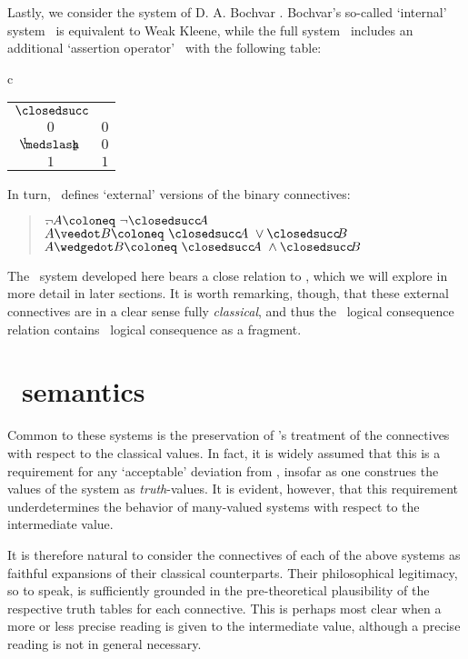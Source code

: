	Lastly, we consider the system of D. A. Bochvar \citeyear{Bochvar1937}. Bochvar's so-called `internal' system \Bthree\ is equivalent to Weak Kleene, while the full system \BthreeE\ includes an additional `assertion operator' \Assert\ with the following table:
\begin{singlespace}	
	\begin{longtable}{c}
		\begin{tabular}{c | c}
			$\Assert$ &  \\
			\cline{1-2} 
			$0$ 		& $0$ \\ 
			$\oneHalf$  & $0$ \\
			$1$ 		& $1$ \\
		\end{tabular} 
	\end{longtable}
\end{singlespace}
\noindent In turn, \BthreeE\ defines `external' versions of the binary connectives:
\begin{singlespace}
	\begin{quote}
			$\BEneg A \Defined\ \neg\Assert A$ \\ 
			$A\BEor B \Defined\ \Assert A\ \vee \Assert B$ \\
			$A\BEand B \Defined\ \Assert A\ \wedge \Assert B$ 
	\end{quote}
\end{singlespace}	
The \GO\ system developed here bears a close relation to \BthreeE, which we will explore in more detail in later sections. It is worth remarking, though, that these external connectives are in a clear sense fully \emph{classical}, and thus the \BthreeE\ logical consequence relation contains \CPL\ logical consequence as a fragment.

	\section{\GO\ semantics}\label{semantics}

	Common to these systems is the preservation of \CPL's treatment of the connectives with respect to the classical values. In fact, it is widely assumed that this is a requirement for any `acceptable' deviation from \CPL, insofar as one construes the values of the system as \emph{truth}-values. It is evident, however, that this requirement underdetermines the behavior of many-valued systems with respect to the intermediate value. 
	
	It is therefore natural to consider the connectives of each of the above systems as faithful expansions of their classical counterparts. Their philosophical legitimacy, so to speak, is sufficiently grounded in the pre-theoretical plausibility of the respective truth tables for each connective. This is perhaps most clear when a more or less precise reading is given to the intermediate value, although a precise reading is not in general necessary.

